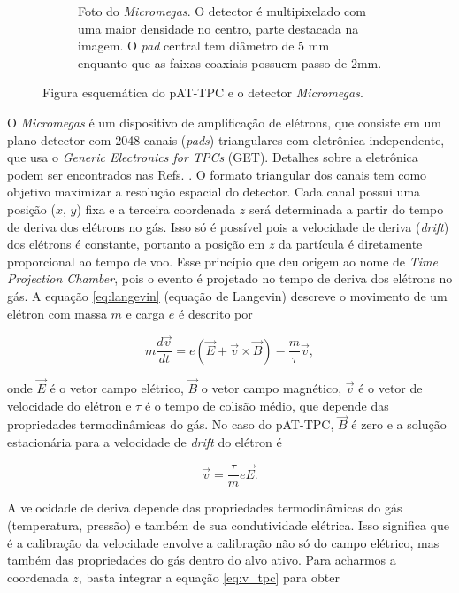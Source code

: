 \documentclass[a4paper,12pt,oneside]{book}
\begin{document}
\begin{figure}[H]
\begin{subfigure}[t]{0.49\textwidth}
        \caption{Foto do \textit{Micromegas}. O detector é multipixelado com uma maior densidade no centro, parte destacada na imagem. O \textit{pad} central tem diâmetro de 5 mm enquanto que as faixas coaxiais possuem passo de 2mm\cite{attpc, josh_bradt}.}
        \label{subfig:micromegas} 
    \end{subfigure}
\caption{Figura esquemática do pAT-TPC e o detector \textit{Micromegas}\cite{pattpc}.}
\label{fig:pattpc_e_micromegas}
\end{figure}

\par O \textit{Micromegas} é um dispositivo de amplificação de elétrons, que consiste em um plano detector com 2048 canais (\textit{pads}) triangulares com eletrônica independente, que usa o \textit{Generic Electronics for TPCs} (GET)\cite{GET}. Detalhes sobre a eletrônica podem ser encontrados nas Refs. \cite{GET, josh_bradt}. O formato triangular dos canais tem como objetivo maximizar a resolução espacial do detector. Cada canal possui uma posição ($x$, $y$) fixa e a terceira coordenada $z$ será determinada a partir do tempo de deriva dos elétrons no gás\cite{pattpc, pattpc2, attpc, josh_bradt}. Isso só é possível pois a velocidade de deriva (\textit{drift}) dos elétrons é constante\cite{drift_constant}, portanto a posição em $z$ da partícula é diretamente proporcional ao tempo de voo. Esse princípio que deu origem ao nome de \textit{Time Projection Chamber}, pois o evento é projetado no tempo de deriva dos elétrons no gás. A equação  \ref{eq:langevin} (equação de Langevin) descreve o movimento de um elétron com massa $m$ e carga $e$ é descrito por\cite{drift_constant}

\begin{equation}\label{eq:langevin}
    m\frac{d\vec{v}}{dt} = e\left(\vec{E} +\vec{v}\times \vec{B}\right) - \frac{m}{\tau}\vec{v},
\end{equation}

onde $\vec{E}$ é o vetor campo elétrico, $\vec{B}$ o vetor campo magnético, $\vec{v}$ é o vetor de velocidade do elétron e $\tau$ é o tempo de colisão médio, que depende das propriedades termodinâmicas do gás. No caso do pAT-TPC, $\vec{B}$ é zero e a solução estacionária para a velocidade de \textit{drift} do elétron é

\begin{equation}\label{eq:v_tpc}
    \vec{v} = \frac{\tau}{m}e\vec{E}.
\end{equation}

\par A velocidade de deriva depende das propriedades termodinâmicas do gás (temperatura, pressão) e também de sua condutividade elétrica\cite{drift_constant}. Isso significa que é a calibração da velocidade envolve a calibração não só do campo elétrico, mas também das propriedades do gás dentro do alvo ativo\cite{pattpc, drift_constant}. Para acharmos a coordenada $z$, basta integrar a equação \ref{eq:v_tpc} para obter
\end{document}
